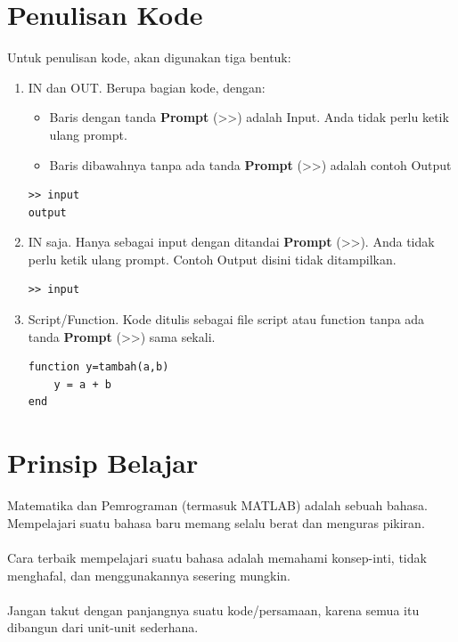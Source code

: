 \documentclass[12pt]{book}
\begin{document}
	\section{Penulisan Kode}
	Untuk penulisan kode, akan digunakan tiga bentuk:
	\begin{enumerate}
		\item IN dan OUT. Berupa bagian kode, dengan:
		\begin{itemize}
			\item Baris dengan tanda \textbf{Prompt} (>>) adalah Input.
			Anda tidak perlu ketik ulang prompt.
			\item Baris dibawahnya tanpa ada tanda \textbf{Prompt} (>>) adalah contoh Output
		\end{itemize}

		\begin{verbatim}
>> input
output
		\end{verbatim}

		\item IN saja. Hanya sebagai input dengan ditandai \textbf{Prompt} (>>).
		Anda tidak perlu ketik ulang prompt.
		Contoh Output disini tidak ditampilkan.

		\begin{verbatim}
>> input
		\end{verbatim}

		\newpage
		\item Script/Function. Kode ditulis sebagai file script atau function tanpa ada tanda \textbf{Prompt} (>>) sama sekali.

		\begin{verbatim}
function y=tambah(a,b)
	y = a + b
end
		\end{verbatim}
	\end{enumerate}

	\section{Prinsip Belajar}

	Matematika dan Pemrograman (termasuk MATLAB) adalah sebuah bahasa.
	Mempelajari suatu bahasa baru memang selalu berat dan menguras pikiran.
	\\
	\\
	Cara terbaik mempelajari suatu bahasa adalah memahami konsep-inti, tidak menghafal,
	dan menggunakannya sesering mungkin.
	\\
	\\
	Jangan takut dengan panjangnya suatu kode/persamaan,
	karena semua itu dibangun dari unit-unit sederhana.
\end{document}
